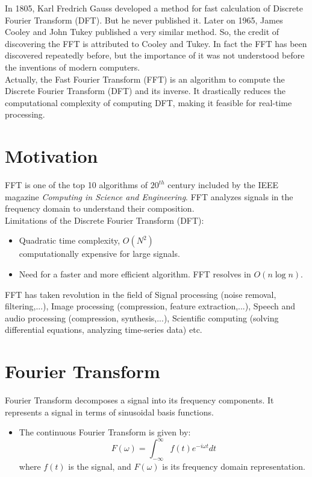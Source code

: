 \documentclass[28]{report}
\begin{document}
In 1805, Karl Fredrich Gauss developed a method for fast calculation of Discrete Fourier Transform (DFT).\cite{wiki} But he never published it. Later on 1965, James Cooley and John Tukey published a very similar method. So, the credit of discovering the FFT is attributed to Cooley and Tukey. In fact the FFT has been discovered repeatedly before, but the importance of it was not understood before the inventions of modern computers. \\


Actually, the Fast Fourier Transform (FFT) is an algorithm to compute the Discrete Fourier Transform (DFT) and its inverse. It drastically reduces the computational complexity of computing
DFT, making it feasible for real-time processing.
\section{Motivation}
FFT is one of the top 10 algorithms of $20^{th}$ century included by the IEEE magazine {\it{Computing in Science and Engineering}}. FFT analyzes signals in the frequency domain to understand their
composition.\\ Limitations of the Discrete Fourier Transform (DFT):
 \begin{itemize}
        \item Quadratic time complexity, $O(N^2)$ \\ computationally expensive for large signals.
        \item Need for a faster and more efficient algorithm. FFT resolves in $O(n\log n)$.
      \end{itemize}
       FFT has taken revolution in the field of Signal processing (noise removal, filtering,...), Image processing (compression, feature extraction,...), Speech and audio processing (compression, synthesis,...), Scientific computing (solving differential equations, analyzing time-series data) etc.
\section{Fourier Transform}
Fourier Transform decomposes a signal into its frequency components.
It represents a signal in terms of sinusoidal basis functions.
\begin{itemize}
    \item The continuous Fourier Transform is given by:
    \[ F(\omega) = \int_{-\infty}^{\infty} f(t) e^{-i\omega t} dt \]
    where $f(t)$ is the signal, and $F(\omega)$ is its frequency domain representation.
  \end{itemize}
\end{document}
